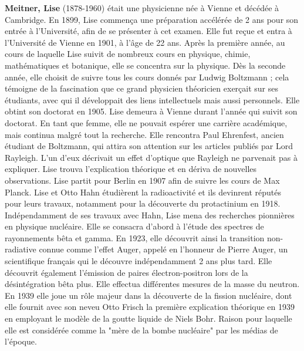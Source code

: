 \textbf{Meitner, Lise} (1878-1960) était une physicienne née à Vienne et décédée à Cambridge. En 1899, Lise commença une préparation accélérée de 2 ans pour son entrée à l'Université, afin de se présenter à cet examen. Elle fut reçue et entra à l'Université de Vienne en 1901, à l'âge de 22 ans. Après la première année, au cours de laquelle Lise suivit de nombreux cours en physique, chimie, mathématiques et botanique, elle se concentra sur la physique. Dès la seconde année, elle choisit de suivre tous les cours donnés par Ludwig Boltzmann ; cela témoigne de la fascination que ce grand physicien théoricien exerçait sur ses étudiants, avec qui il développait des liens intellectuels mais aussi personnels. Elle obtint son doctorat en 1905. Lise demeura à Vienne durant l'année qui suivit son doctorat. En tant que femme, elle ne pouvait espérer une carrière académique, mais continua malgré tout la recherche. Elle rencontra Paul Ehrenfest, ancien étudiant de Boltzmann, qui attira son attention sur les articles publiés par Lord Rayleigh. L'un d'eux décrivait un effet d'optique que Rayleigh ne parvenait pas à expliquer. Lise trouva l'explication théorique et en dériva de nouvelles observations. Lise partit pour Berlin en 1907 afin de suivre les cours de Max Planck. Lise et Otto Hahn étudièrent la radioactivité et ils devinrent réputés pour leurs travaux, notamment pour la découverte du protactinium en 1918. Indépendamment de ses travaux avec Hahn, Lise mena des recherches pionnières en physique nucléaire. Elle se consacra d'abord à l'étude des spectres de rayonnements bêta et gamma. En 1923, elle découvrit ainsi la transition non-radiative connue comme l'effet Auger, appelé en l'honneur de Pierre Auger, un scientifique français qui le découvre indépendamment 2 ans plus tard. Elle découvrit également l'émission de paires électron-positron lors de la désintégration bêta plus. Elle effectua différentes mesures de la masse du neutron. En 1939 elle joue un rôle majeur dans la découverte de la fission nucléaire, dont elle fournit avec son neveu Otto Frisch la première explication théorique en 1939 en employant le modèle de la goutte liquide de Niels Bohr. Raison pour laquelle elle est considérée comme la "mère de la bombe nucléaire" par les médias de l'époque.

